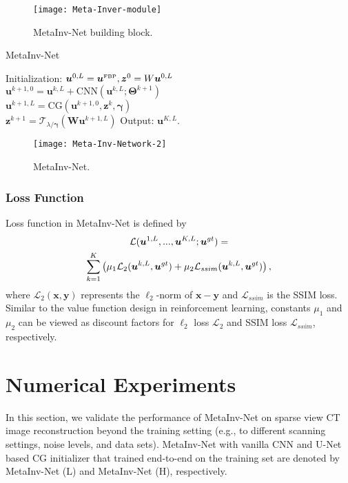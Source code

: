 \documentclass[journal,twoside]{IEEEtran}
\begin{document}
\begin{figure}[ht]
\centering
\texttt{[image: Meta-Inver-module]}\label{Meta-Inversion}
\caption{MetaInv-Net building block.}
\label{fig:Meta-inversion-block}
\end{figure}

\begin{algorithm}[ht]
\caption{ MetaInv-Net}
\label{alg:meta-HQS}
\begin{algorithmic}[1]
\STATE 
\small{Initialization:} $\bm{u}^{0,L}=\bm{u}^{\mbox{\tiny FBP}},\bm{z}^{0}=W\bm{u}^{0,L}$
\\
\STATE 
 $\bm{u}^{k+1,0}=\bm{u}^{k,L}+\mbox{CNN}(\bm{u}^{k,L};\bm{\Theta}^{k+1})$\\
\STATE
 $\bm{u}^{k+1,L}= \mbox{CG}(\bm{u}^{k+1,0},\bm{z}^{k},\bm{\gamma})$\\
\STATE
 $\bm{z}^{k+1}=\mathcal{T}_{\lambda/\bm{\gamma}}(\bm{W}\bm{u}^{k+1,L})$
\ENDFOR
\STATE Output: $\bm{u}^{K,L}$.
\end{algorithmic}
\end{algorithm}


\begin{figure*}[ht]
\centering
\texttt{[image: Meta-Inv-Network-2]}\label{Meta-Inv-Network}
\caption{MetaInv-Net.}
\label{fig:Meta-Inv-Network}
\end{figure*}

\subsubsection{Loss Function}

Loss function in MetaInv-Net is defined by
\begin{multline*}
\mathcal{L}(\bm{u}^{1,L},...,\bm{u}^{K,L};\bm{u}^{gt})=\cr \sum_{k=1}^{K}\left(\mu_{1} \mathcal{L}_{2}(\bm{u}^{k,L},\bm{u}^{gt})+\mu_{2}\mathcal{L}_{ssim}(\bm{u}^{k,L},\bm{u}^{gt})\right),\notag
\end{multline*} 
where $\mathcal{L}_{2}(\bm{x},\bm{y})$ represents the $\ell_{2}$-norm of $\bm{x}-\bm{y}$ and $\mathcal{L}_{ssim}$ is the SSIM loss. Similar to the value function design in reinforcement learning, constants $\mu_{1}$ and $\mu_{2}$ can be viewed as discount factors for $\ell_{2}$ loss $\mathcal{L}_{2}$ and SSIM loss $\mathcal{L}_{ssim}$, respectively. 


\section{Numerical Experiments}\label{sec:numerical-simul}
In this section, we validate the performance of MetaInv-Net on sparse view CT image reconstruction beyond the training setting (e.g., to different scanning settings, noise levels, and data sets). MetaInv-Net with vanilla CNN and U-Net based CG initializer that trained end-to-end on the training set are denoted by MetaInv-Net (L) and MetaInv-Net (H), respectively.
\end{document}
